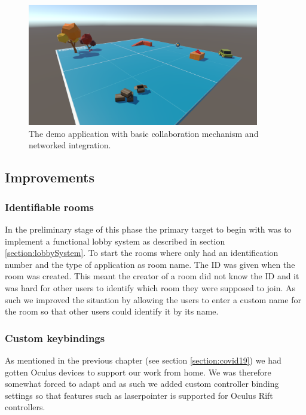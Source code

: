 \begin{figure}[H]
  \centering
   \captionsetup{width=.9\linewidth}
    \includegraphics[width=0.9\textwidth]{fig/phase_3/implementation/demoApp.PNG}
 \caption{The demo application with basic collaboration mechanism and networked integration.}
\label{fig:phase3_demoApp}
\end{figure}






\subsection{Improvements}


\subsubsection{Identifiable rooms}
In the preliminary stage of this phase the primary target to begin with was to implement a functional lobby system as described in section \ref{section:lobbySystem}. To start the rooms where only had an identification number and the type of application as room name. The ID was given when the room was created. This meant the creator of a room did not know the ID and it was hard for other users to identify which room they were supposed to join. As such we improved the situation by allowing the users to enter a custom name for the room so that other users could identify it by its name.   


\subsubsection{Custom keybindings}
As mentioned in the previous chapter (see section \ref{section:covid19}) we had gotten Oculus devices to support our work from home. We was therefore somewhat forced to adapt and as such we added custom controller binding settings so that features such as laserpointer is supported for Oculus Rift controllers.   



